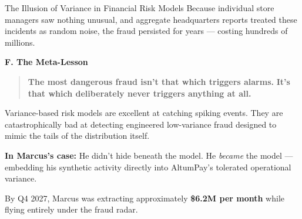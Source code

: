 \begin{HistoricalSidebar}{The Illusion of Variance in Financial Risk Models}
    Because individual store managers saw nothing unusual, and aggregate headquarters reports treated these incidents as random noise, the fraud persisted for years — costing hundreds of millions.
    
    \medskip
    
    \textbf{F. The Meta-Lesson}
    
    \begin{quote}
    \textbf{The most dangerous fraud isn’t that which triggers alarms.}  
    \textbf{It’s that which deliberately never triggers anything at all.}
    \end{quote}
    
    Variance-based risk models are excellent at catching spiking events.  
    They are catastrophically bad at detecting engineered low-variance fraud designed to mimic the tails of the distribution itself.
    
    \medskip
    
    \textbf{In Marcus’s case:}  
    He didn’t hide beneath the model.  
    He \textit{became} the model --- embedding his synthetic activity directly into AltumPay’s tolerated operational variance.
    
\end{HistoricalSidebar}




\medskip

By Q4 2027, Marcus was extracting approximately \textbf{\$6.2M per month} while flying entirely under the fraud radar.


